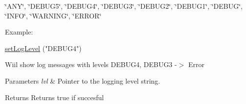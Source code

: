 \char`\"{}\-A\-N\-Y\char`\"{}, \char`\"{}\-D\-E\-B\-U\-G5\char`\"{}, \char`\"{}\-D\-E\-B\-U\-G4\char`\"{}, \char`\"{}\-D\-E\-B\-U\-G3\char`\"{}, \char`\"{}\-D\-E\-B\-U\-G2\char`\"{}, \char`\"{}\-D\-E\-B\-U\-G1\char`\"{}, \char`\"{}\-D\-E\-B\-U\-G\char`\"{}, \char`\"{}\-I\-N\-F\-O\char`\"{}, \char`\"{}\-W\-A\-R\-N\-I\-N\-G\char`\"{}, \char`\"{}\-E\-R\-R\-O\-R\char`\"{}

Example\-:
\begin{DoxyCode}
\hyperlink{group__logging_ga6e6cb15a163ea13e5ef9f0ebfded2c78}{setLogLevel} (\textcolor{stringliteral}{"DEBUG4"}) 
\end{DoxyCode}


Wiil show log messages with levels D\-E\-B\-U\-G4, D\-E\-B\-U\-G3 -\/$>$ Error


\begin{DoxyParams}{Parameters}
{\em lvl} & Pointer to the logging level string. \\
\hline
\end{DoxyParams}
\begin{DoxyReturn}{Returns}
Returns true if succesful 
\end{DoxyReturn}

